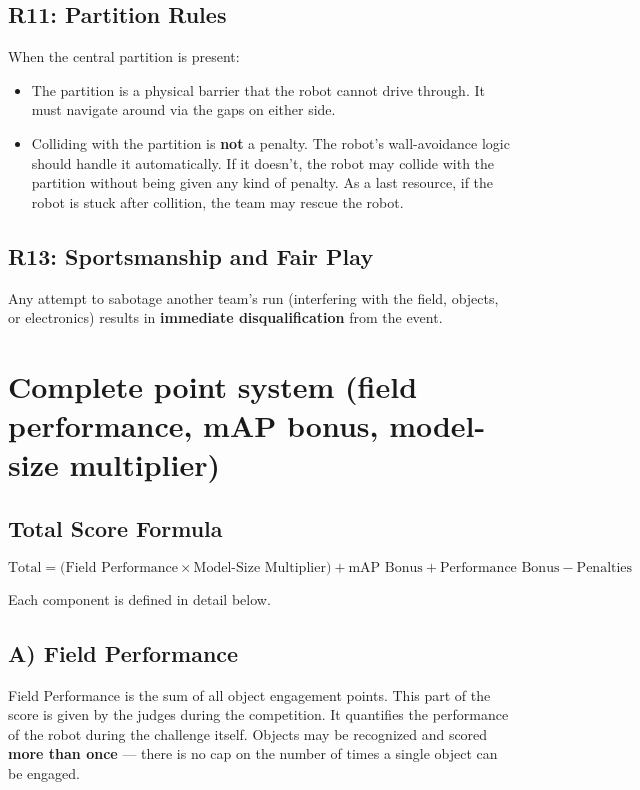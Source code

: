 \documentclass[a4]{article}
\begin{document}
\subsection*{R11: Partition Rules}
When the central partition is present:
\begin{itemize}
    \item The partition is a physical barrier that the robot cannot drive through. It must navigate around via the gaps on either side.
    \item Colliding with the partition is \textbf{not} a penalty. The robot's wall-avoidance logic should handle it automatically. If it doesn't, the robot may collide with the partition without being given any kind of penalty. As a last resource, if the robot is stuck after collition, the team may rescue the robot. 
\end{itemize}

\subsection*{R13: Sportsmanship and Fair Play}
Any attempt to sabotage another team's run (interfering with the field, objects, or electronics) results in \textbf{immediate disqualification} from the event.
\pagebreak

\section*{Complete point system (field performance, mAP bonus, model-size multiplier)}
\subsection*{Total Score Formula}

\begin{equation*}
\boxed{\text{Total} = \bigl(\text{Field Performance} \times \text{Model-Size Multiplier}\bigr) + \text{mAP Bonus}  + \text{Performance Bonus} -\text{Penalties}}
\end{equation*}

Each component is defined in detail below.

\subsection*{A) Field Performance}

Field Performance is the sum of all object engagement points. This part of the score is given by the judges during the competition. It quantifies the performance of the robot during the challenge itself. Objects may be recognized and scored \textbf{more than once} --- there is no cap on the number of times a single object can be engaged.
\end{document}
